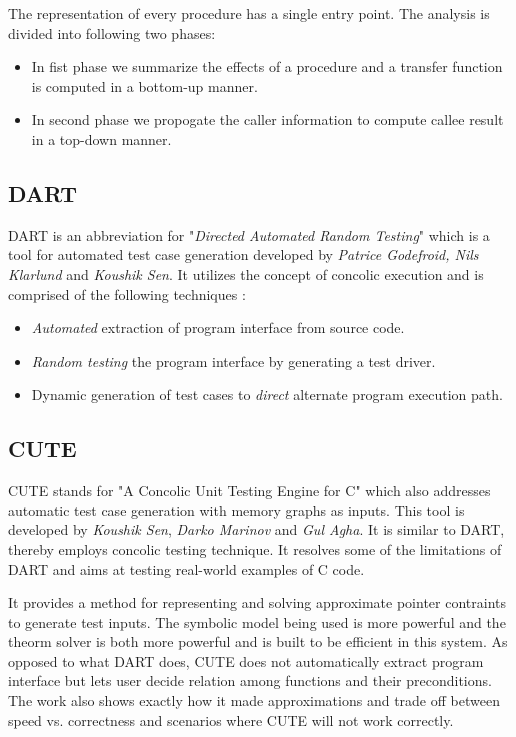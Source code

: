 \documentclass[12pt,oneside]{book}
\begin{document}
The representation of every procedure has a single entry point. The analysis is divided into following two phases:
\begin{itemize}
  \item In fist phase we summarize the effects of a procedure and a transfer function is computed in a bottom-up manner.
  \item  In second phase we propogate the caller information to compute callee result in a top-down manner.
\end{itemize}


\subsection {DART}
DART is an abbreviation for "\textit{Directed Automated Random Testing}" which is a tool for automated test case generation developed by \textit{Patrice Godefroid, Nils Klarlund} and \textit{Koushik Sen}. It utilizes the concept of concolic execution and is comprised of the following techniques :
\begin{itemize}
 \item \textit{Automated} extraction of program interface from source code.
 \item \textit{Random testing} the program interface by generating a test driver. 
 \item Dynamic generation of test cases to \textit{direct} alternate program execution path.
\end{itemize}

\newpage


\subsection{CUTE}
CUTE stands for "A Concolic Unit Testing Engine for C" which also addresses automatic test case generation with memory graphs as inputs. This tool is developed by \textit{Koushik Sen}, \textit{Darko Marinov} and \textit{Gul Agha}. It is similar to DART, thereby employs concolic testing technique. It resolves some of the limitations of DART and aims at testing real-world examples of C code.

It provides a method for representing and solving approximate pointer contraints to generate test inputs. The symbolic model being used is more powerful and the theorm solver is both more powerful and is built to be efficient in this system. As opposed to what DART does, CUTE does not automatically extract program interface but lets user decide relation among functions and their preconditions. The work also shows exactly how it made approximations and trade off between speed vs. correctness and scenarios where CUTE will not work correctly.
\end{document}
